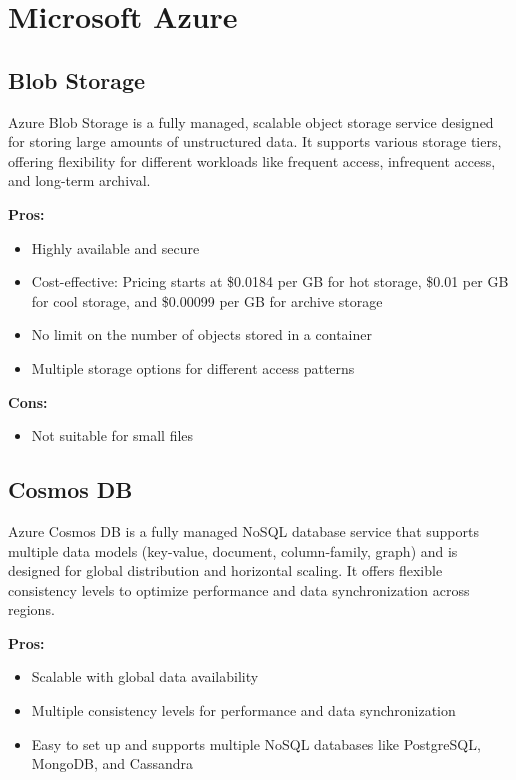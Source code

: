 \section{Microsoft Azure}
\label{azure}

\subsection*{Blob Storage}
\label{azure:blob-storage}
Azure Blob Storage is a fully managed, scalable object storage service designed for storing large amounts of unstructured data. It supports various storage tiers, offering flexibility for different workloads like frequent access, infrequent access, and long-term archival.

\textbf{Pros:}
\begin{itemize}
    \item Highly available and secure
    \item Cost-effective: Pricing starts at \$0.0184 per GB for hot storage, \$0.01 per GB for cool storage, and \$0.00099 per GB for archive storage
    \item No limit on the number of objects stored in a container
    \item Multiple storage options for different access patterns
\end{itemize}

\textbf{Cons:}
\begin{itemize}
    \item Not suitable for small files
\end{itemize}

\subsection*{Cosmos DB}
\label{azure:cosmos-db}
Azure Cosmos DB is a fully managed NoSQL database service that supports multiple data models (key-value, document, column-family, graph) and is designed for global distribution and horizontal scaling. It offers flexible consistency levels to optimize performance and data synchronization across regions.

\textbf{Pros:}
\begin{itemize}
    \item Scalable with global data availability
    \item Multiple consistency levels for performance and data synchronization
    \item Easy to set up and supports multiple NoSQL databases like PostgreSQL, MongoDB, and Cassandra
\end{itemize}

